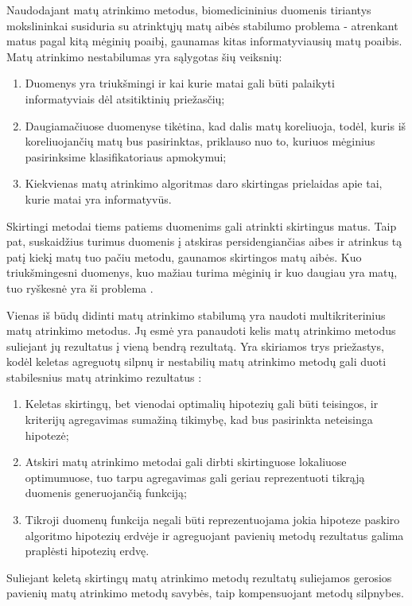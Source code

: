 Naudodajant matų atrinkimo metodus, biomedicininius duomenis tiriantys mokslininkai susiduria su atrinktųjų matų aibės stabilumo problema - atrenkant matus pagal kitą mėginių poaibį, gaunamas kitas informatyviausių matų poaibis. Matų atrinkimo nestabilumas yra sąlygotas šių veiksnių:
\begin{enumerate}
 \item Duomenys yra triukšmingi ir kai kurie matai gali būti palaikyti informatyviais dėl atsitiktinių priežasčių;
 \item Daugiamačiuose duomenyse tikėtina, kad dalis matų koreliuoja, todėl, kuris iš koreliuojančių matų bus pasirinktas, priklauso nuo to, kuriuos mėginius pasirinksime klasifikatoriaus apmokymui;
 \item Kiekvienas matų atrinkimo algoritmas daro skirtingas prielaidas apie tai, kurie matai yra informatyvūs.
\end{enumerate}
Skirtingi metodai tiems patiems duomenims gali atrinkti skirtingus matus. Taip pat, suskaidžius turimus duomenis į atskiras persidengiančias aibes ir atrinkus tą patį kiekį matų tuo pačiu metodu, gaunamos skirtingos matų aibės. Kuo triukšmingesni duomenys, kuo mažiau turima mėginių ir kuo daugiau yra matų, tuo ryškesnė yra ši problema \cite{loscalzo2009consensus}. 

Vienas iš būdų didinti matų atrinkimo stabilumą yra naudoti multikriterinius matų atrinkimo metodus. Jų esmė yra panaudoti kelis matų atrinkimo metodus suliejant jų rezultatus į vieną bendrą rezultatą. Yra skiriamos trys priežastys, kodėl keletas agreguotų silpnų ir nestabilių matų atrinkimo metodų gali duoti stabilesnius matų atrinkimo rezultatus \cite{dietterich2000ensemble}:
\begin{enumerate}
 \item Keletas skirtingų, bet vienodai optimalių hipotezių gali būti teisingos, ir kriterijų agregavimas sumažiną tikimybę, kad bus pasirinkta neteisinga  hipotezė;
 \item Atskiri matų atrinkimo metodai gali dirbti skirtinguose lokaliuose optimumuose, tuo tarpu agregavimas gali geriau reprezentuoti tikrąją  duomenis generuojančią funkciją;
 \item Tikroji duomenų funkcija negali būti reprezentuojama jokia hipoteze paskiro algoritmo hipotezių erdvėje ir agreguojant pavienių metodų rezultatus galima praplėsti hipotezių erdvę.
\end{enumerate}
Suliejant keletą skirtingų matų atrinkimo metodų rezultatų suliejamos gerosios pavienių matų atrinkimo metodų savybės, taip kompensuojant metodų silpnybes.

